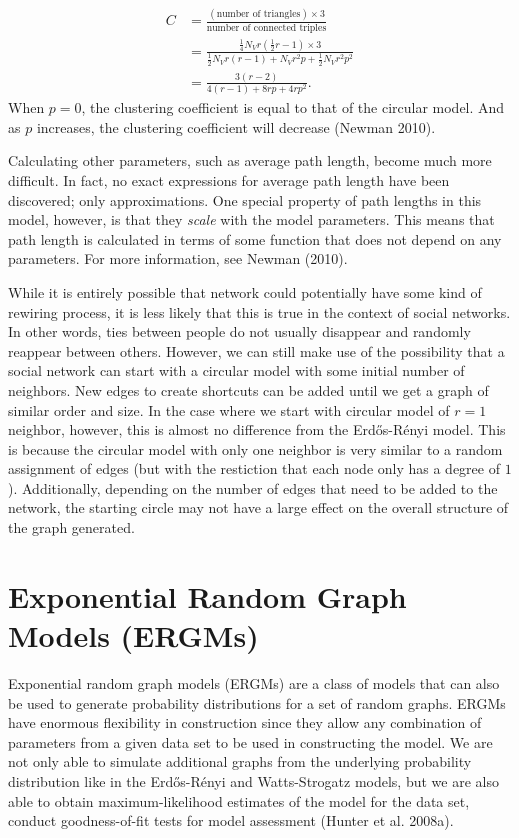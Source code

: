 \documentclass[12pt,twoside]{amherstthesis}
\begin{document}
  \[
  \begin{aligned}
  C &= \frac {(\text{number of triangles}) \times 3} {\text{number of connected triples}}  \\
  &= \frac {\frac {1} {4} N_{V} r \left(\frac {1} {2} r - 1 \right) \times 3} {\frac {1} {2} N_{V} r(r - 1) + N_{V}r^{2}p + \frac {1} {2} N_{V} r^{2} p^2} \\
  &= \frac{3(r - 2)} {4(r - 1)+8rp + 4rp^{2}}.
  \end{aligned}
  \] When \(p = 0\), the clustering coefficient is equal to that of the
  circular model. And as \(p\) increases, the clustering coefficient will
  decrease (Newman 2010).
  
  Calculating other parameters, such as average path length, become much
  more difficult. In fact, no exact expressions for average path length
  have been discovered; only approximations. One special property of path
  lengths in this model, however, is that they \emph{scale} with the model
  parameters. This means that path length is calculated in terms of some
  function that does not depend on any parameters. For more information,
  see Newman (2010).
  
  While it is entirely possible that network could potentially have some
  kind of rewiring process, it is less likely that this is true in the
  context of social networks. In other words, ties between people do not
  usually disappear and randomly reappear between others. However, we can
  still make use of the possibility that a social network can start with a
  circular model with some initial number of neighbors. New edges to
  create shortcuts can be added until we get a graph of similar order and
  size. In the case where we start with circular model of \(r = 1\)
  neighbor, however, this is almost no difference from the Erdős-Rényi
  model. This is because the circular model with only one neighbor is very
  similar to a random assignment of edges (but with the restiction that
  each node only has a degree of \(1\)). Additionally, depending on the
  number of edges that need to be added to the network, the starting
  circle may not have a large effect on the overall structure of the graph
  generated.
  
  \section{Exponential Random Graph Models
  (ERGMs)}\label{exponential-random-graph-models-ergms}
  
  Exponential random graph models (ERGMs) are a class of models that can
  also be used to generate probability distributions for a set of random
  graphs. ERGMs have enormous flexibility in construction since they allow
  any combination of parameters from a given data set to be used in
  constructing the model. We are not only able to simulate additional
  graphs from the underlying probability distribution like in the
  Erdős-Rényi and Watts-Strogatz models, but we are also able to obtain
  maximum-likelihood estimates of the model for the data set, conduct
  goodness-of-fit tests for model assessment (Hunter et al. 2008a).
  
\end{document}
